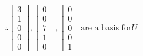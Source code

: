 \documentclass[fleqn]{article}
\begin{document}
\begin{enumerate}[nolistsep]
\begin{enumerate}[nolistsep]
				\begin{singlespacing}
					\setlength{\abovedisplayskip}{0pt}
					\setlength{\belowdisplayskip}{10pt}
					\setlength{\abovedisplayshortskip}{0pt}
					\setlength{\belowdisplayshortskip}{10pt}
					\setlength{\mathindent}{0pt}
					\begin{align*}
					\therefore \begin{bmatrix}3 \\ 1 \\ 0 \\ 0 \\ 0 \end{bmatrix},  \begin{bmatrix}0 \\ 0 \\ 7 \\ 1 \\ 0 \end{bmatrix}, \begin{bmatrix}0 \\ 0 \\ 0 \\ 0 \\ 1 \end{bmatrix} \text{are a basis for} U
					\end{align*}
				\end{singlespacing}
			\end{enumerate}
	\end{enumerate}
	
\end{document}
